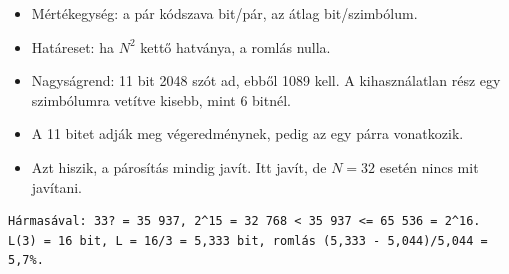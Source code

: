 \begin{center}\end{center}
\begin{eredmeny}

\begin{center}\end{center}
\end{eredmeny}
\begin{tipp}[Ellenőrzés]
\begin{itemize}
\item Mértékegység: a pár kódszava bit/pár, az átlag bit/szimbólum.
\item Határeset: ha $N^2$ kettő hatványa, a romlás nulla.
\item Nagyságrend: 11 bit 2048 szót ad, ebből 1089 kell. A kihasználatlan rész egy szimbólumra vetítve kisebb, mint 6 bitnél.
\end{itemize}
\end{tipp}
\begin{figyelem}
\begin{itemize}
\item A 11 bitet adják meg végeredménynek, pedig az egy párra vonatkozik.
\item Azt hiszik, a párosítás mindig javít. Itt javít, de $N=32$ esetén nincs mit javítani.
\end{itemize}
\end{figyelem}
\begin{tipp}
\small
\begin{verbatim}
Hármasával: 33? = 35 937, 2^15 = 32 768 < 35 937 <= 65 536 = 2^16.
L(3) = 16 bit, L = 16/3 = 5,333 bit, romlás (5,333 - 5,044)/5,044 = 5,7%.
\end{verbatim}
\end{tipp}
\begin{tipp}

\par{}\par
\end{tipp}


